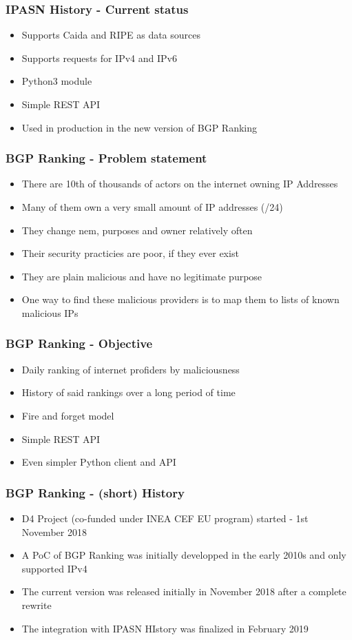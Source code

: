 \documentclass{beamer}
\begin{document}
\begin{frame}
    \frametitle{IPASN History - Current status}
    \begin{itemize}
        \item Supports Caida and RIPE as data sources
        \item Supports requests for IPv4 and IPv6
        \item Python3 module
        \item Simple REST API
        \item Used in production in the new version of BGP Ranking
    \end{itemize}
\end{frame}

\begin{frame}
    \frametitle{BGP Ranking - Problem statement}
    \begin{itemize}
        \item There are 10th of thousands of actors on the internet owning IP Addresses
        \item Many of them own a very small amount of IP addresses (/24)
        \item They change nem, purposes and owner relatively often
        \item Their security practicies are poor, if they ever exist
        \item They are plain malicious and have no legitimate purpose
        \item One way to find these malicious providers is to map them to lists of known malicious IPs
    \end{itemize}
\end{frame}


\begin{frame}
 \frametitle{BGP Ranking - Objective}
 \begin{itemize}
         \item Daily ranking of internet profiders by maliciousness
         \item History of said rankings over a long period of time
         \item Fire and forget model
         \item Simple REST API
         \item Even simpler Python client and API
 \end{itemize}
\end{frame}

\begin{frame}
        \frametitle{BGP Ranking - (short) History}
 \begin{itemize}
        \item D4 Project (co-funded under INEA CEF EU program) started - 1st November 2018
        \item A PoC of BGP Ranking was initially developped in the early 2010s and only supported IPv4
        \item The current version was released initially in November 2018 after a complete rewrite
        \item The integration with IPASN HIstory was finalized in February 2019
 \end{itemize}
\end{frame}
\end{document}
